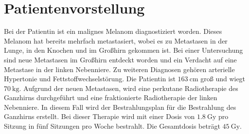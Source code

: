 \section{Patientenvorstellung}

Bei der Patientin ist ein malignes Melanom diagnostiziert worden. Dieses Melanom
hat bereits mehrfach metastasiert, wobei es zu Metastasen in der Lunge, in den Knochen und
im Großhirn gekommen ist. Bei einer Untersuchung sind neue Metastasen im Großhirn entdeckt worden und
ein Verdacht auf eine Metastase in der linken Nebenniere. Zu weiteren Diagnosen gehören
arterielle Hypertonie und Fettstoffwechselstörung. Die Patientin ist $\SI{163}{\centi\meter}$
groß und wiegt $\SI{70}{\kilo\gram}$. Aufgrund der neuen Metastasen, wird eine perkutane
Radiotherapie des Ganzhirns durchgeführt und eine fraktionierte Radiotherapie der linken Nebenniere.
In diesem Fall wird der Bestrahlungsplan für die Bestrahlung des Ganzhirns erstellt. Bei
dieser Therapie wird mit einer Dosis von $\SI{1.8}{\gray}$ pro Sitzung in fünf Sitzungen
pro Woche bestrahlt. Die Gesamtdosis beträgt $\SI{45}{\gray}$.
